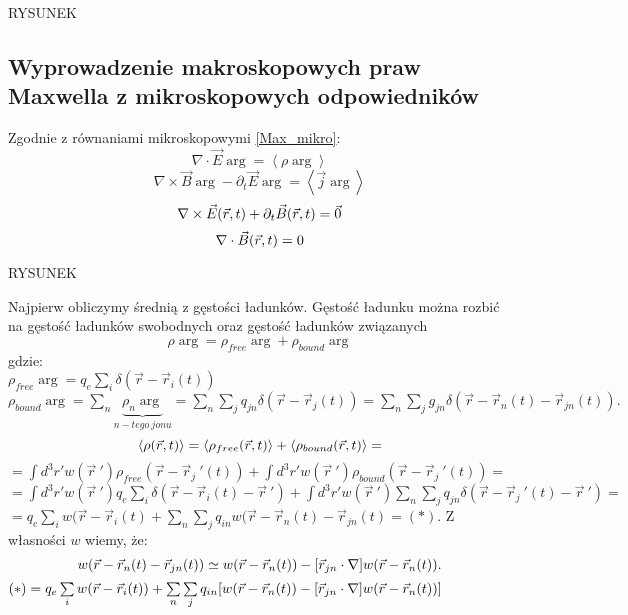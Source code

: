 RYSUNEK
\subsection{Wyprowadzenie makroskopowych praw Maxwella z 
mikroskopowych odpowiedników}
Zgodnie z równaniami mikroskopowymi \ref{Max_mikro}:
\begin{equation} 
	\nabla \cdot \vec{E}\arg=\left< \rho \arg \right> \label{startr1}
\end{equation}
\begin{equation} 
	\nabla \times \vec{B}\arg-\partial_t\vec{E}\arg=\left< \vec{j}\arg
	\right> \label{startr2}
\end{equation}
\begin{equation} 
	\nabla \times \vec{E}(\vec{r},t)+\partial_t \vec{B}(\vec{r},t)=\vec{0} \label{startr3}
\end{equation}
\begin{equation} 
	\nabla \cdot \vec{B}(\vec{r},t)=0 \label{startr4}
\end{equation}
\begin{center} RYSUNEK \end{center}
Najpierw obliczymy średnią z gęstości ładunków.
Gęstość ładunku można rozbić na gęstość ładunków swobodnych oraz 
gęstość ładunków związanych
$$\rho \arg = \rho_{free} \arg + \rho_{bound} \arg$$
gdzie:\\
$\rho_{free} \arg = q_e \sum\limits_i \delta (\vec{r}-\vec{r}_i(t))$\\
$\rho_{bound} \arg = \sum\limits_n \underbrace{\rho_n\arg}_{n-tego\
jonu}  = \sum\limits_n \sum\limits_j q_{jn} \delta (\vec{r}-\vec{r}_j(t)) 
= \sum\limits_{n} \sum\limits_{j} g_{jn}\delta(\vec{r}-\vec{r}_n(t)-
\vec{r}_{jn}(t)).$\\
$$\left<  \rho (\vec{r},t)  \right> = \left< \rho_{free}(\vec{r},t) \right> + \left< \rho_{bound}(\vec{r},t) \right> = $$
$=\int d^3r' w(\vec{r}\ ') \rho_{free}(\vec{r}-\vec{r}_j\ '(t))+
\int d^3r' w(\vec{r}\ ') \rho_{bound}(\vec{r}-\vec{r}_j\ '(t))=$\\
$ = \int d^3r' w(\vec{r}\ ')q_e \sum\limits_{i}\delta (\vec{r}-\vec{r}_i(t)
-\vec{r}\ ') + \int d^3r' w(\vec{r}\ ') \sum\limits_n \sum\limits_j q_{jn}
\delta (\vec{r}-\vec{r}_j\ '(t) - \vec{r}\ ')= $\\
$ = q_e \sum\limits_i w(\vec{r} - \vec{r}_i(t)+ \sum\limits_n \sum\limits_j q_{in} 
w(\vec{r}-\vec{r}_n(t)-\vec{r}_{jn}(t)=(*) .$
Z własności $w$ wiemy, że:
$$w(\vec{r}-\vec{r}_n(t)-\vec{r}_{jn}(t))\simeq w(\vec{r}-\vec{r}_n(t))-
[\vec{r}_{jn}\cdot\nabla]w(\vec{r}-\vec{r}_n(t)).$$
$(*)=  q_e \sum\limits_i w(\vec{r} - \vec{r}_i(t))+ \sum\limits_n 
\sum\limits_j q_{in} 
[w(\vec{r}-\vec{r}_n(t))-[\vec{r}_{jn}\cdot\nabla]w(\vec{r}-\vec{r}_n(t))]$\\
